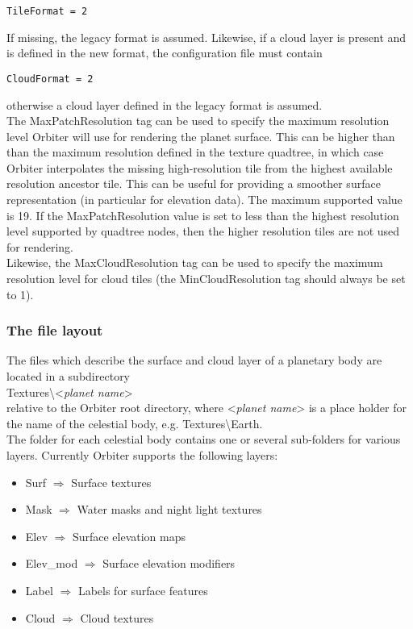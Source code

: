 \documentclass[Orbiter Developer Manual.tex]{subfiles}
\begin{document}
\begin{lstlisting}[language=OSFS]
TileFormat = 2
\end{lstlisting}

\noindent
If missing, the legacy format is assumed. Likewise, if a cloud layer is present and is defined in the new format, the configuration file must contain

\begin{lstlisting}[language=OSFS]
CloudFormat = 2
\end{lstlisting}

\noindent
otherwise a cloud layer defined in the legacy format is assumed.\\
The MaxPatchResolution tag can be used to specify the maximum resolution level Orbiter will use for rendering the planet surface. This can be higher than than the maximum resolution defined in the texture quadtree, in which case Orbiter interpolates the missing high-resolution tile from the highest available resolution ancestor tile. This can be useful for providing a smoother surface representation (in particular for elevation data). The maximum supported value is 19. If the MaxPatchResolution value is set to less than the highest resolution level supported by quadtree nodes, then the higher resolution tiles are not used for rendering.\\
Likewise, the MaxCloudResolution tag can be used to specify the maximum resolution level for cloud tiles (the MinCloudResolution tag should always be set to 1).


\subsubsection{The file layout}
\label{sssec:tile_file_layout}
The files which describe the surface and cloud layer of a planetary body are located in a subdirectory\\
\indent Textures\textbackslash <\textit{planet name}>\\
relative to the Orbiter root directory, where <\textit{planet name}> is a place holder for the name of the celestial body, e.g. Textures\textbackslash Earth.\\
The folder for each celestial body contains one or several sub-folders for various layers. Currently Orbiter supports the following layers:

\begin{itemize}
\item Surf $\Rightarrow$ Surface textures
\item Mask $\Rightarrow$ Water masks and night light textures
\item Elev $\Rightarrow$ Surface elevation maps
\item Elev\_mod $\Rightarrow$ Surface elevation modifiers
\item Label $\Rightarrow$ Labels for surface features
\item Cloud $\Rightarrow$ Cloud textures
\end{itemize}
\end{document}
